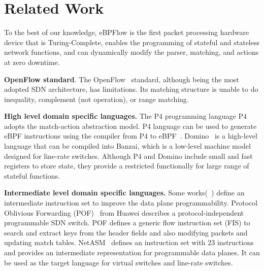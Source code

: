 \section{Related Work}
\label{sec:relatedWork}

%

To the best of our knowledge, eBPFlow is the first packet processing hardware device that is Turing-Complete, enables the programming of stateful and stateless network functions, and can dynamically modify the parser, matching, and actions at zero downtime.

\textbf{OpenFlow standard}. The OpenFlow~\cite{McKeown:2008:OpenFlow} standard, although being the most adopted SDN architecture, has limitations. Its matching structure is unable to do inequality, complement (not operation), or range matching. 


\textbf{High level domain specific languages.} The P4 programming language P4~\cite{Bosshart:2014:P4} adopts the match-action abstraction model. 
P4 language can be used to generate eBPF instructions using the compiler from P4 to eBPF~\cite{P42EBPF2015}. Domino~\cite{Sivaraman:2016:PTH:2934872.2934900} is a high-level language that can be compiled into Banzai, which is a low-level machine model designed for line-rate switches. 
Although P4 and Domino include small and fast registers to store state, they provide a restricted functionally for large range of stateful functions.

\textbf{Intermediate level domain specific languages.} Some works(~\cite{Song:2013:POF:2491185.2491190,Shahbaz:2015:NetASM,Sivaraman:2016:PTH:2934872.2934900}) define an intermediate instruction set to improve the data plane programmability.
Protocol Oblivious Forwarding (POF)~\cite{Song:2013:POF:2491185.2491190} from Huawei describes a protocol-independent programmable SDN switch. POF defines a generic flow instruction set (FIS) to search and extract keys from the header fields and also modifying packets and updating match tables. NetASM~\cite{Shahbaz:2015:NetASM} defines an instruction set with 23 instructions and provides an intermediate representation for programmable data planes. It can be used as the target language for virtual switches and line-rate switches. 

